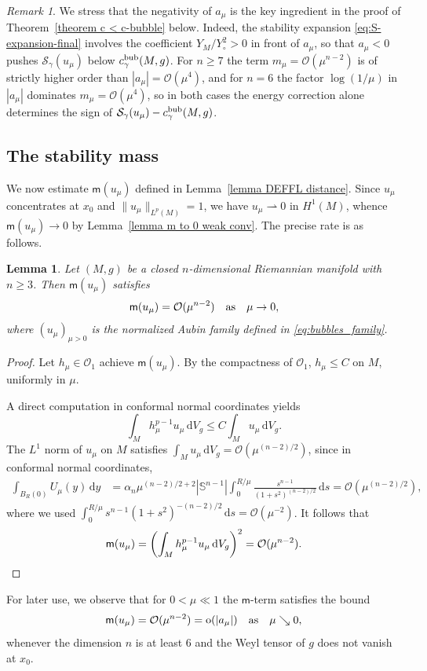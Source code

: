 \documentclass[reqno,11pt]{amsart}
\numberwithin{equation}{section}
\newtheorem{lemma}[theorem]{Lemma}
\theoremstyle{definition}
\theoremstyle{remark}
\newtheorem{remark}[theorem]{Remark}
\newcommand{\ud}{\,\mathrm{d}}
\newcommand{\Ss}{\mathbb{S}}
\begin{document}
\begin{remark}
   We stress that the negativity of $a_\mu$ is the key ingredient in the proof of
   Theorem~\ref{theorem c < c-bubble} below. Indeed, the stability
   expansion \eqref{eq:S-expansion-final} involves the coefficient
   $Y_M/Y_\circ^2 > 0$ in front of $a_\mu$, so that $a_\mu < 0$ pushes
   $\mathcal{S}_\gamma(u_\mu)$ below $c_{\gamma}^{\rm bub}(M,g)$. For $n \geqslant 7$
   the term $m_\mu = \mathcal{O}(\mu^{n-2})$ is of strictly higher order than $|a_\mu|
   = \mathcal{O}(\mu^4)$, and for $n = 6$ the factor $\log(1/\mu)$ in $|a_\mu|$ dominates
   $m_\mu = \mathcal{O}(\mu^4)$, so in both cases the energy correction alone determines the sign of
   $\mathcal{S}_\gamma(u_\mu) - c_{\gamma}^{\rm bub}(M,g)$.
 
\end{remark}

\subsection{The stability mass}
We now estimate $\mathsf{m}(u_\mu)$ defined in Lemma~\ref{lemma DEFFL distance}. 
Since $u_\mu$ concentrates at $x_0$ and $\|u_\mu\|_{L^p(M)} = 1$, we have $u_\mu \rightharpoonup 0$ 
in $H^1(M)$, whence $\mathsf{m}(u_\mu) \to 0$ by Lemma~\ref{lemma m to 0 weak conv}. The precise 
rate is as follows.

\begin{lemma}
\label{lemma:moment-rate}
Let $(M, g)$ be a closed $n$-dimensional Riemannian manifold with $n \geqslant 3$. Then $\mathsf{m} (u_\mu)$ 
satisfies 
\[
\mathsf{m}(u_\mu) = \mathcal{O}(\mu^{n-2}) \quad {\rm as} \quad \mu \to 0 , 
\]
where $(u_\mu)_{\mu > 0}$ is the normalized Aubin family defined in \eqref{eq:bubbles_family}.
\end{lemma}

\begin{proof}
Let $h_\mu \in \mathscr{O}_1$ achieve $\mathsf{m}(u_\mu)$. By the compactness of $\mathscr{O}_1$, $h_\mu \leqslant C$ on $M$, uniformly in $\mu$. 

A direct computation in conformal normal coordinates yields
\[
\int_M h_\mu^{p-1} u_\mu \ud V_g \leqslant C \int_M u_\mu \ud V_g. 
\]
The $L^1$ norm of $u_\mu$ on $M$ satisfies $\int_M u_\mu \ud V_g = \mathcal{O}(\mu^{(n-2)/2})$, since in conformal normal coordinates,
\begin{align*}
\int_{B_R(0)} U_\mu(y) \ud y &= \alpha_n \mu^{(n-2)/2 + 2}|\Ss^{n-1}| \int_0^{R/\mu} \frac{s^{n-1}}{(1 + s^2)^{(n-2)/2}} \ud s= \mathcal{O}\!\left(\mu^{(n-2)/2}\right),
\end{align*}
where we used $\int_0^{R/\mu} s^{n-1}(1+s^2)^{-(n-2)/2} \ud s = \mathcal{O}(\mu^{-2})$. It follows that
\[
\mathsf{m}(u_\mu) = \left(\int_M h_\mu^{p-1} u_\mu \ud V_g\right)^2 = \mathcal{O}(\mu^{n-2}).  \qedhere
\]
\end{proof}
For later use, we observe that for $0 < \mu \ll 1$ the $\mathsf{m}$-term satisfies the bound 
\[\mathsf{m}(u_\mu) = \mathcal{O}(\mu^{n-2}) = \mathrm{o}(|a_\mu|) \quad
{\rm as} \quad \mu \searrow 0,\] whenever the dimension $n$ is at least $6$ and the Weyl tensor of $g$ does not 
vanish at $x_0$. 
\end{document}
